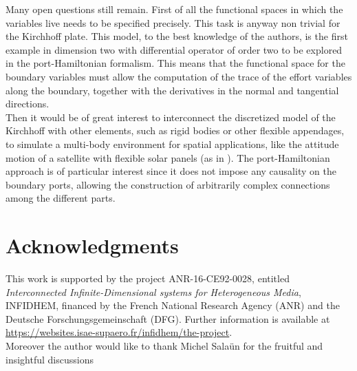 \documentclass[preprint,12pt]{elsarticle}
\begin{document}
  	Many open questions still remain. First of all the functional spaces in which the variables live needs to be specified precisely. This task is anyway non trivial for the Kirchhoff plate. This model, to the best knowledge of the authors, is the first example in dimension two with differential operator of order two to be explored in the port-Hamiltonian formalism. This means that the functional space for the boundary variables must allow the computation of the trace of the effort variables along the boundary, together with the derivatives in the normal and tangential directions. \\
  	 
	Then it would be of great interest to interconnect the discretized model of the Kirchhoff with other elements, such as rigid bodies or other flexible appendages, to simulate a multi-body environment for spatial applications, like the attitude motion of a satellite with flexible solar panels (as in \cite{aoues:hal-01738092}). The port-Hamiltonian approach is of particular interest since it does not impose any causality on the boundary ports, allowing the construction of arbitrarily complex connections among the different parts.
	
	\section*{Acknowledgments}
This work is supported by the project ANR-16-CE92-0028,
entitled {\em Interconnected Infinite-Dimensional systems for Heterogeneous
Media}, INFIDHEM, financed by the French National Research Agency (ANR) and the Deutsche Forschungsgemeinschaft (DFG). Further information is available at {\url{https://websites.isae-supaero.fr/infidhem/the-project}}. \\
Moreover the author would like to thank Michel Sala\"un for the fruitful and insightful discussions


 
	
	
	
\end{document}
